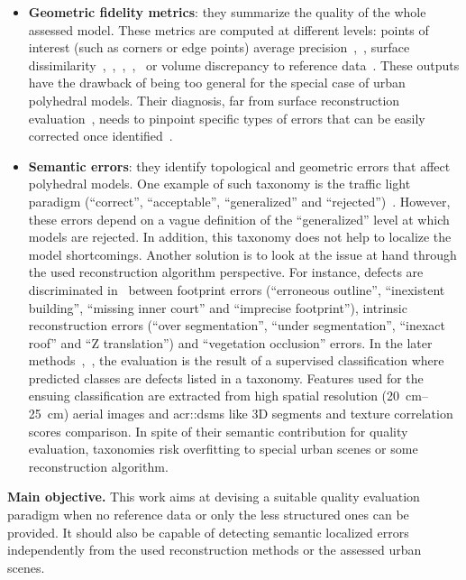 \documentclass[runningheads]{llncs}
\begin{document}
\begin{itemize}
    \item \textbf{Geometric fidelity metrics}: they summarize the quality of the whole assessed model. These metrics are computed at different levels: points of interest (such as corners or edge points) average precision~\cite{Kaartinen2005},~\cite{vogtle2003quality}, surface dissimilarity~\cite{Kaartinen2005},~\cite{Henricsson1997},~\cite{Zeng2014},~\cite{lafarge2012creating},~\cite{li2016boxfitting} or volume discrepancy to reference data~\cite{Zeng2014}. These outputs have the drawback of being too general for the special case of urban polyhedral models. Their diagnosis, far from surface reconstruction evaluation~\cite{berger2013benchmark}, needs to pinpoint specific types of errors that can be easily corrected once identified~\cite{OudeElberink2010}.
    \item \textbf{Semantic errors}: they identify topological and geometric errors that affect polyhedral models. One example of such taxonomy is the traffic light paradigm (``correct'', ``acceptable'', ``generalized'' and ``rejected'')~\cite{boudet2006supervised}. However, these errors depend on a vague definition of the ``generalized'' level at which models are rejected. In addition, this taxonomy does not help to localize the model shortcomings. Another solution is to look at the issue at hand through the used reconstruction algorithm perspective. For instance, defects are discriminated in~\cite{Michelin2013} between footprint errors (``erroneous outline'', ``inexistent building'', ``missing inner court'' and ``imprecise footprint''), intrinsic reconstruction errors (``over segmentation'', ``under segmentation'', ``inexact roof'' and ``Z translation'') and ``vegetation occlusion'' errors. In the later methods~\cite{boudet2006supervised},~\cite{Michelin2013}, the evaluation is the result of a supervised classification where predicted classes are defects listed in a taxonomy. Features used for the ensuing classification are extracted from high spatial resolution (\SIrange{20}{25}{\cm}) aerial images and \glspl{acr::dsm} like 3D segments and texture correlation scores comparison. In spite of their semantic contribution for quality evaluation, taxonomies risk overfitting to special urban scenes or some reconstruction algorithm.
\end{itemize}

\noindent
\textbf{Main objective.}
This work aims at devising a suitable quality evaluation paradigm when no reference data or only the less structured ones can be provided. It should also be capable of detecting semantic localized errors independently from the used reconstruction methods or the assessed urban scenes.
\end{document}
